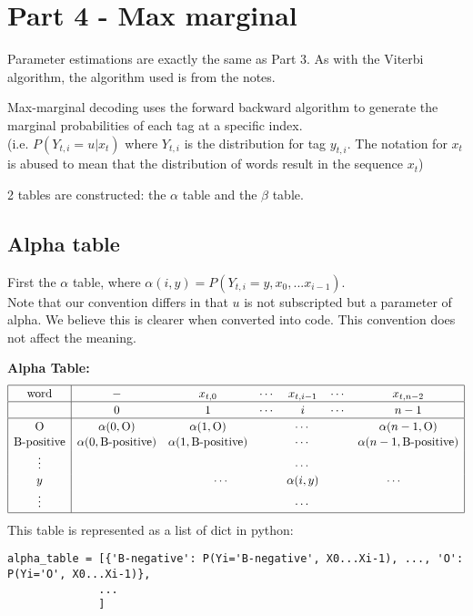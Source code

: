 \documentclass[12pt]{article}
\begin{document}
\pagebreak

\section{Part 4 - Max marginal}

Parameter estimations are exactly the same as Part 3. As with the Viterbi algorithm, the algorithm used is from the notes.

\bigskip

Max-marginal decoding uses the forward backward algorithm to generate the marginal probabilities of each tag at a specific index.\\
(i.e. \(P(Y_{t,i}=u | x_t)\) where \(Y_{t,i}\) is the distribution for tag \(y_{t,i}\). The notation for \(x_t\) is abused to mean that the distribution of words result in the sequence \(x_t\))

2 tables are constructed: the \(\alpha\) table and the \(\beta\) table.

\subsection{Alpha table}
First the \(\alpha\) table, where \(\alpha(i, y) = P(Y_{t,i}=y, x_0, ... x_{i-1})\).\\
Note that our convention differs in that \(u\) is not subscripted but a parameter of alpha. We believe this is clearer when converted into code. This convention does not affect the meaning.

\textbf{Alpha Table:}
\[
\begin{array}{|c|cccccc|}
\hline \rule{0pt}{1em}
\mbox{word} & - & x_{t,0} & \cdots & x_{t,i-1} & \cdots & x_{t,n-2} \\
\hline \rule{0pt}{1em}
& 0 & 1 & \cdots & i & \cdots & n-1 \\
\hline \rule{0pt}{1em}
\mbox{O}          & \alpha(0,\mbox{O}) & \alpha(1,\mbox{O}) & \multicolumn{3}{c}{\cdots} & \alpha(n-1,\mbox{O}) \\[0.1em]
\mbox{B-positive} & \alpha(0,\mbox{B-positive}) & \alpha(1,\mbox{B-positive}) & \multicolumn{3}{c}{\cdots} & \alpha(n-1,\mbox{B-positive}) \\[0.1em]
\vdots & &         & \multicolumn{3}{c}{\cdots} &            \\[0.1em]
y      & &\multicolumn{2}{c}{\cdots} & \alpha(i,y) & \multicolumn{2}{c|}{\cdots} \\[0.1em]
\vdots & &         & \multicolumn{3}{c}{\cdots} &            \\[0.1em]
\hline
\end{array}
\]
This table is represented as a list of dict in python:
\begin{verbatim}
alpha_table = [{'B-negative': P(Yi='B-negative', X0...Xi-1), ..., 'O': P(Yi='O', X0...Xi-1)},
              ...
              ]
\end{verbatim}
\end{document}
